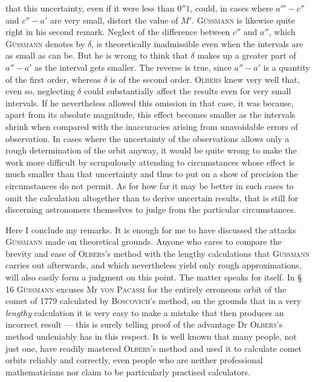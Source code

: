 that this uncertainty, even if it were less than $0''1$, could, in cases where $a'''\!-c''$ and $c''\!-a'$ are very small, distort the value of $M'$. \textsc{Güssmann} is likewise quite right in his second remark. Neglect of the difference between $c''$ and $a''$, which \textsc{Güssmann} denotes by $\delta$, is theoretically inadmissible even when the intervals are as small as can be. But he is wrong to think that $\delta$ makes up a greater part of $a''\!-a'$ as the interval gets smaller. The reverse is true, since $a''\!-a'$ is a quantity of the first order, whereas $\delta$ is of the second order. \textsc{Olbers} knew very well that, even so, neglecting $\delta$ could substantially affect the results even for very small intervals. If he nevertheless allowed this omission in that case, it was because, apart from its absolute magnitude, this effect becomes smaller as the intervals shrink when compared with the inaccuracies arising from unavoidable errors of observation. In cases where the uncertainty of the observations allows only a rough determination of the orbit anyway, it would be quite wrong to make the work more difficult by scrupulously attending to circumstances whose effect is much smaller than that uncertainty and thus to put on a show of precision the circumstances do not permit. As for how far it may be better in such cases to omit the calculation altogether than to derive uncertain results, that is still for discerning astronomers themselves to judge from the particular circumstances.

Here I conclude my remarks. It is enough for me to have discussed the attacks \textsc{Güssmann} made on theoretical grounds. Anyone who cares to compare the brevity and ease of \textsc{Olbers}’s method with the lengthy calculations that \textsc{Güssmann} carries out afterwards, and which nevertheless yield only rough approximations, will also easily form a judgment on this point. The matter speaks for itself. In § 16 \textsc{Güssmann} excuses Mr \textsc{von Pacassi} for the entirely erroneous orbit of the comet of 1779 calculated by \textsc{Boscovich}’s method, on the grounds that in a very \emph{lengthy} calculation it is very easy to make a mistake that then produces an incorrect result --- this is surely telling proof of the advantage Dr \textsc{Olbers}’s method undeniably has in this respect. It is well known that many people, not just one, have readily mastered \textsc{Olbers}’s method and used it to calculate comet orbits reliably and correctly, even people who are neither professional mathematicians nor claim to be particularly practised calculators.
